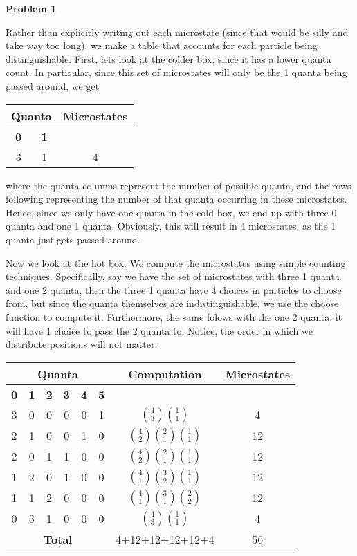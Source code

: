 \documentclass[10pt]{article}
\begin{document}
\textbf{Problem 1}

Rather than explicitly writing out each microstate (since that would be silly and take way too long), we make a table that accounts for each particle being distinguishable. First, lets look at the colder box, since it has a lower quanta count. In particular, since this set of microstates will only be the 1 quanta being passed around, we get


\begin{center}
\begin{tabular}{|c|c|c|}
 \hline
 \multicolumn{2}{|c|}{\textbf{Quanta}} & \textbf{Microstates} \\
 \hline
 \textbf{0} & \textbf{1} & \\
  \hline
  3 & 1 & 4 \\
 \hline
\end{tabular}
\end{center}

where the quanta columns represent the number of possible quanta, and the rows following representing the number of that quanta occurring in these microstates. Hence, since we only have one quanta in the cold box, we end up with three 0 quanta and one 1 quanta. Obviously, this will result in 4 microstates, as the 1 quanta just gets passed around.

Now we look at the hot box. We compute the microstates using simple counting techniques. Specifically, say we have the set of microstates with three 1 quanta and one 2 quanta, then the three 1 quanta have 4 choices in particles to choose from, but since the quanta themselves are indistinguishable, we use the choose function to compute it. Furthermore, the same folows with the one 2 quanta, it will have 1 choice to pass the 2 quanta to. Notice, the order in which we distribute positions will not matter.

\begin{center}
\begin{tabular}{|c|c|c|c|c|c|c|c|}
 \hline
 \multicolumn{6}{|c|}{\textbf{Quanta}} & \textbf{Computation} & \textbf{Microstates}\\
 \hline
 \textbf{0} & \textbf{1} & \textbf{2} & \textbf{3} & \textbf{4} & \textbf{5} & & \\
  \hline
  3 & 0 & 0 & 0 & 0 & 1 & ${{4}\choose{3}}{{1}\choose{1}}$ &4\\
  \hline
  2 & 1 & 0 & 0 & 1 & 0 & ${{4}\choose{2}}{{2}\choose{1}}{{1}\choose{1}}$ &12\\
  \hline
  2 & 0 & 1 & 1 & 0 & 0 & ${{4}\choose{2}}{{2}\choose{1}}{{1}\choose{1}}$ &12\\
  \hline
  1 & 2 & 0 & 1 & 0 & 0 & ${{4}\choose{1}}{{3}\choose{2}}{{1}\choose{1}}$ &12\\
  \hline
  1 & 1 & 2 & 0 & 0 & 0 & ${{4}\choose{1}}{{3}\choose{1}}{{2}\choose{2}}$ &12\\
  \hline
  0 & 3 & 1 & 0 & 0 & 0 & ${{4}\choose{3}}{{1}\choose{1}}$ &4\\
  \hline
  \multicolumn{6}{|c|}{\textbf{Total}} & 4+12+12+12+12+4 & 56 \\
  \hline
\end{tabular}
\end{center}
\end{document}
